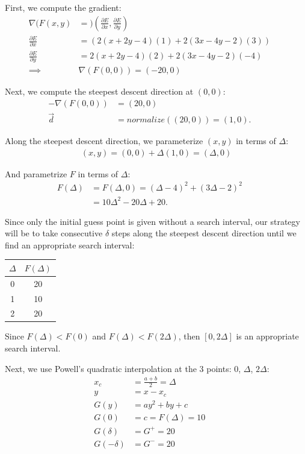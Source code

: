 \documentclass{article}
\begin{document}
First, we compute the gradient:
\begin{align*}
  \nabla (F(x,y) 
  &= )\left( \frac{\partial E}{\partial x}, \frac{\partial E}{\partial y} \right) &&\\
  \frac{\partial E}{\partial x} &= \left( 2(x + 2y - 4)(1) + 2(3x - 4y - 2)(3) \right) &&\\
  \frac{\partial E}{\partial y} &=  2(x + 2y - 4)(2) + 2(3x - 4y - 2)(-4) &&\\
  \implies& \nabla (F(0,0)) = \left(-20, 0 \right)
\end{align*}

Next, we compute the steepest descent direction at $(0,0)$:
\begin{align*}
  -\nabla (F(0,0)) &= \left(20, 0\right) &&\\
  \vec{d} &= normalize\left(\left(20, 0\right)\right) = \left(1,0\right).
\end{align*}

Along the steepest descent direction, we parameterize $(x,y)$ in terms of $\Delta$:
\begin{align*}
  \left(x, y\right) = \left(0,0\right) + \Delta\left(1, 0\right) = \left(\Delta, 0\right)
\end{align*}

And parametrize $F$ in terms of $\Delta$:
\begin{align*}
  F(\Delta) 
  &= F(\Delta, 0) = (\Delta - 4)^2 + (3\Delta - 2)^2 &&\\
  &= 10 \Delta^2 - 20 \Delta + 20.
\end{align*}

Since only the initial guess point is given without a search interval, our strategy will be to take consecutive $\delta$ steps along the steepest descent direction until we find an appropriate search interval:

\begin{center}
  \begin{tabular}{ |c|c| }
  \hline
  $\Delta$ & $F(\Delta)$  \\ 
  \hline 
  0	& 20	\\
  1	& 10	\\
  2	& 20	\\
  \hline
  \end{tabular}
\end{center}

Since $F(\Delta) < F(0)$ and $F(\Delta) < F(2 \Delta)$, then $[0, 2 \Delta]$ is an appropriate search interval.

Next, we use Powell's quadratic interpolation at the 3 points: $0$, $\Delta$, $2 \Delta$:
\begin{align*}
  x_c &= \frac{a+b}{2} = \Delta &&\\
  y &= x-x_c &&\\
  G(y) &= ay^2 + by + c &&\\
  G(0) &= c = F(\Delta) = 10 &&\\
  G(\delta) &= G^+ = 20 &&\\
  G(- \delta) &= G^- = 20 &&\\
\end{align*}
\end{document}
